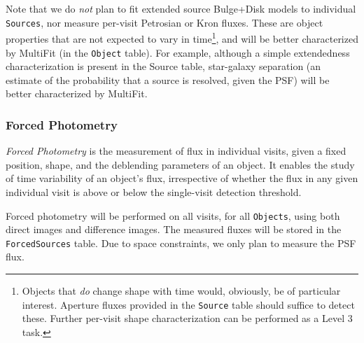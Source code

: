 \documentclass[12pt]{article}
\newcommand{\code}[1]{\texttt{#1}}
\newcommand{\Object}{\code{Object}\xspace}
\newcommand{\Objects}{\code{Objects}\xspace}
\newcommand{\Source}{\code{Source}\xspace}
\newcommand{\Sources}{\code{Sources}\xspace}
\newcommand{\ForcedSources}{\code{ForcedSources}\xspace}
\newcommand{\req}[1]{\marginpar{\tiny #1}}
\newcommand{\dmreq}[1]{\req{DMS-REQ-#1}}
\begin{document}
\begin{itemize}

\end{itemize}

Note that we do \emph{not} plan to fit extended source Bulge+Disk models to individual \Sources, nor measure per-visit Petrosian or Kron fluxes. These are object properties that are not expected to vary in time\footnote{Objects that \emph{do} change shape with time would, obviously, be of particular interest. Aperture fluxes provided in the \Source table should suffice to detect these. Further per-visit shape characterization can be performed as a Level 3 task.}, and will be better characterized by MultiFit (in the \Object table).
For example, although a simple extendedness characterization is present in the Source table, star-galaxy separation (an estimate of the probability that a source is resolved, given the PSF) will be better characterized by MultiFit.


\subsubsection{Forced Photometry}
\label{sec:forcedPhotL2}
\dmreq{0268}\dmreq{0287}

\emph{Forced Photometry} is the measurement of flux in individual visits, given a fixed position, shape, and the deblending parameters of an object. It enables the study of time variability of an object's flux, irrespective of whether the flux in any given individual visit is above or below the single-visit detection threshold.

Forced photometry will be performed on all visits, for all \Objects, using both direct images and difference images.
The measured fluxes will be stored in the \ForcedSources table. Due to space constraints, we only plan to measure the PSF flux.
\end{document}
